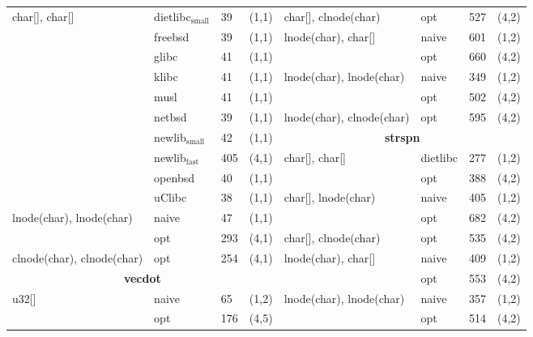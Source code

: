 \begin{figure}[H]
\begin{scriptsize}
\begin{tabular}{lllclllc}
char[], char[] & dietlibc$\mathrm{_{small}}$ & 39 & (1,1) &                 char[], clnode(char) & opt & 527 & (4,2) \\
       & freebsd & 39 & (1,1) &                                             lnode(char), char[] & naive & 601 & (1,2) \\
       & glibc & 41 & (1,1) &                                                                  & opt & 660 & (4,2) \\ 
       & klibc & 41 & (1,1) &                                               lnode(char), lnode(char) & naive & 349 & (1,2) \\
       & musl & 41 & (1,1) &                                                                        & opt & 502 & (4,2) \\
       & netbsd & 39 & (1,1) &                                              lnode(char), clnode(char) & opt & 595 & (4,2) \\
       & newlib$\mathrm{_{small}}$ & 42 & (1,1) &                              \multicolumn{4}{c}{\bf strspn} \\
       & newlib$\mathrm{_{fast}}$ & 405 & (4,1) &                              char[], char[] & dietlibc & 277 & (1,2)                   \\
       & openbsd & 40 & (1,1) &                                                              & opt      & 388 & (4,2)                    \\
       & uClibc & 38 & (1,1) &                                                 char[], lnode(char) & naive & 405 & (1,2)                 \\
lnode(char), lnode(char) & naive & 47 & (1,1) &                                                   & opt & 682 & (4,2)                    \\ 
            & opt & 293 & (4,1) &                                              char[], clnode(char) & opt & 535 & (4,2)                  \\
clnode(char), clnode(char) & opt & 254 & (4,1) &                               lnode(char), char[] & naive & 409 & (1,2)           \\
\multicolumn{4}{c}{\bf vecdot} &                                                          & opt & 553 & (4,2)              \\
u32[] & naive & 65 & (1,2) &                                                  lnode(char), lnode(char) & naive & 357 & (1,2)        \\
      & opt & 176 & (4,5)   &                                                                          & opt & 514 & (4,2)        \\

\end{tabular}
\end{scriptsize}
\end{figure}
